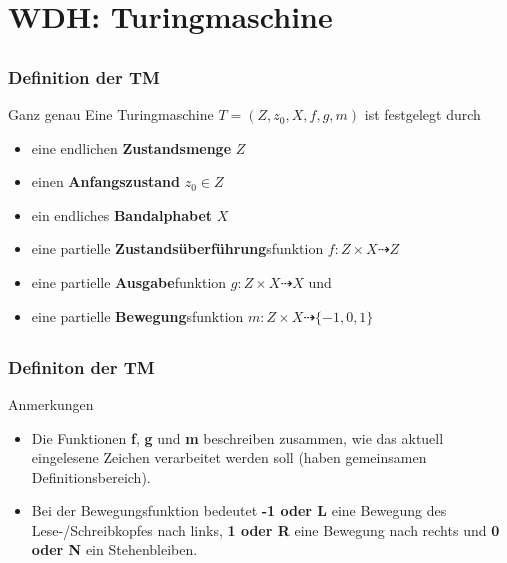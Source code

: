 
\section{WDH: Turingmaschine}

\subsection*{}
\begin{frame}
  \frametitle{Definition der TM}

  \begin{block}{Ganz genau}
    Eine Turingmaschine $T = (Z, z_0, X, f, g, m)$ ist festgelegt durch
\begin{itemize}
	\item eine endlichen \textbf{Zustandsmenge} $Z$
	\item einen \textbf{Anfangszustand} $z_0 \in Z$
	\item ein endliches \textbf{Bandalphabet} $X$
	\pause
	\item eine partielle \textbf{Zustandsüberführung}sfunktion $f : Z \times X \dashrightarrow  Z$
	\item eine partielle \textbf{Ausgabe}funktion $g : Z \times X \dashrightarrow  X$ und
	\item eine partielle \textbf{Bewegung}sfunktion $m : Z \times X \dashrightarrow  \{-1, 0, 1\}$\end{itemize}
\end{block}
\end{frame}

\subsection*{}
\begin{frame}
  \frametitle{Definiton der TM}

  \begin{block}{Anmerkungen}
\begin{itemize}
	\item Die Funktionen \textbf{f}, \textbf{g} und \textbf{m} beschreiben zusammen, wie das aktuell eingelesene Zeichen verarbeitet werden soll (haben gemeinsamen Definitionsbereich).
	\pause
	\item Bei der Bewegungsfunktion bedeutet \textbf{-1 oder L} eine Bewegung des Lese-/Schreibkopfes nach links, \textbf{1 oder R}
eine Bewegung nach rechts und \textbf{0 oder N} ein Stehenbleiben.
\end{itemize}
\end{block}
\end{frame}

